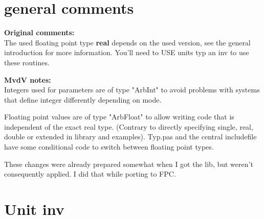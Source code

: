 \documentclass{report}
\begin{document}
\section{general comments}

\textbf{Original comments:} \\ 
The used floating point type \textbf{real} depends on the used version,
see the general introduction for more information. You'll need to USE
units typ an inv to use these routines. 

\textbf{MvdV notes:} \\
Integers used for parameters are of type "ArbInt" to avoid problems with
systems that define integer differently depending on mode. 

Floating point values are of type "ArbFloat" to allow writing code
that is independent of the exact real type. (Contrary to directly
specifying single, real, double or extended in library and
examples). Typ.pas and the central includefile have some conditional
code to switch between floating point types.

These changes were already prepared somewhat when I got the lib, but weren't
consequently applied. I did that while porting to FPC.

\section{Unit inv}
\end{document}

